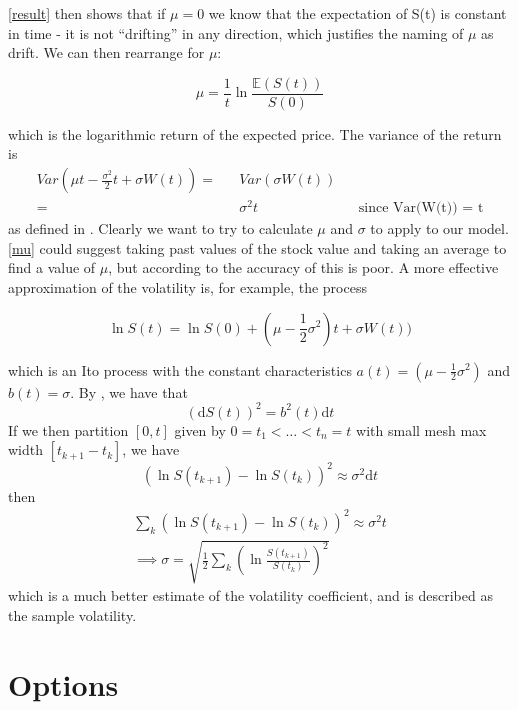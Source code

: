 \documentclass[11pt]{article} %
\begin{document}
\eqref{result} then shows that if $\mu = 0$ we know that the expectation of S(t) is 
constant in time - it is not ``drifting'' in any direction, which justifies the 
naming of $\mu$ as drift. We can then rearrange for $\mu$:

\begin{equation} \label{mu}
    \mu = \frac{1}{t}\ln{\frac{\mathbb{E}(S(t))}{S(0)}}
\end{equation}

which is the logarithmic return of the expected price.
The variance of the return is 
\begin{align}
    Var(\mu t - \frac{\sigma^2}{2}t + \sigma W(t)) = && Var(\sigma W(t)) \\
    = && \sigma^2t  && \text{since Var(W(t)) = t}
\end{align}
as defined in \cite{blackscholes}. Clearly we want to try to calculate $\mu$ and 
$\sigma$ to apply to our model. \eqref{mu} could suggest taking past values of the 
stock value and taking an average to find a value of $\mu$, but according to 
\cite{blackscholes} the accuracy of this is poor. 
A more effective approximation of the volatility is, for example, the process 

\begin{equation}
    \ln{S(t)} = \ln{S(0)} + (\mu - \frac{1}{2}\sigma^2)t + \sigma W(t))
\end{equation}

which is an Ito process with the constant characteristics $a(t) = (\mu - \frac{1}{2}\sigma^2)$
 and $b(t) = \sigma$. By \cite{quadtraticvariation}, we have that
 \begin{equation}
     (\mathrm{d}S(t))^2 = b^2(t) \mathrm{d}t
 \end{equation}
 If we then partition $[0,t]$ given by $0 = t_1 < \dots < t_n = t$ with small mesh max 
 width $[t_{k+1} - t_k]$, we have 
 \begin{equation}
     (\ln{S(t_{k+1}) - \ln{S(t_k)}})^2 \approx \sigma^2 \mathrm{d}t
 \end{equation}
then 
\begin{align}
    \sum_k (\ln{S(t_{k+1}) - \ln{S(t_k)}})^2 \approx \sigma^2 t\\
    \implies
    \sigma = \sqrt{\frac{1}{2}\sum_k (\ln{\frac{S(t_{k+1})}{S(t_k)}})^2}
    \label{volatilityapprox}
\end{align}
which is a much better estimate of the volatility coefficient, and is described as the 
sample volatility.
\section{Options}
\end{document}
